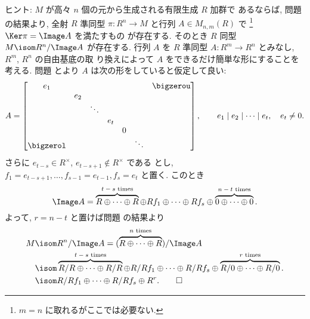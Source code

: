 \documentclass[12pt,twoside]{jarticle}
\begin{document}
\noindent
ヒント: $M$ が高々 $n$ 個の元から生成される有限生成 $R$ 加群で
あるならば, 問題  の結果より, 
全射 $R$ 準同型 $\pi:R^n\to M$ と行列 $A\in M_{n,m}(R)$ で%
\footnote{$m=n$ に取れるがここでは必要ない.} $\Ker\pi=\Image A$ を満たすもの
が存在する.  そのとき $R$ 同型 $M\isom R^n/\Image A$ が存在する.
行列 $A$ を $R$ 準同型 $A:R^m\to R^n$ とみなし, $R^m$, $R^n$ の自由基底の取
り換えによって $A$ をできるだけ簡単な形にすることを考える.
問題  とより
$A$ は次の形をしていると仮定して良い:
\begin{equation*}
  A =
  \begin{bmatrix}
    e_1 &     &        &     &   & & \bigzerou \\
        & e_2 &        &     &   & & \\
        &     & \ddots &     &   & & \\
        &     &        & e_t &   & & \\
        &     &        &     & 0 & & \\
    \bigzerol & &      &     &   & \ddots & \\
  \end{bmatrix},
  \qquad
  e_1\mid e_2\mid\cdots\mid e_t, \quad
  e_t\ne 0.
\end{equation*}
さらに $e_{t-s}\in R^\times$, $e_{t-s+1}\not\in R^\times$ である
とし, $f_1=e_{t-s+1},\dots,f_{s-1}=e_{t-1},f_s=e_t$ と置く.
このとき
\begin{equation*}
  \Image A = 
  \overbrace{R\oplus\cdots\oplus R}^{\text{$t-s$ times}}
  \oplus
  R f_1\oplus\cdots\oplus Rf_s
  \oplus
  \overbrace{0\oplus\cdots\oplus 0}^{\text{$n-t$ times}}.
\end{equation*}
よって, $r=n-t$ と置けば問題  の結果より
\begin{align*}
  M 
  &
  \isom R^n/\Image A
  =
  (\overbrace{R\oplus\cdots\oplus R}^{\text{$n$ times}})/\Image A
  \\ &
  \isom
  \overbrace{R/R\oplus\cdots\oplus R/R}^{\text{$t-s$ times}}
  \oplus
  R/R f_1\oplus\cdots\oplus R/Rf_s
  \oplus
  \overbrace{R/0\oplus\cdots\oplus R/0}^{\text{$r$ times}}.
  \\ &
  \isom
  R/R f_1\oplus\cdots\oplus R/Rf_s \oplus R^r.
  \qed
\end{align*}

\end{document}
